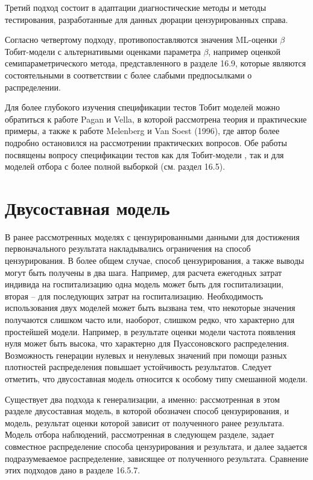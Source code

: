 Третий подход состоит в адаптации диагностические методы и методы тестирования, разработанные для данных дюрации цензурированных справа.


Согласно четвертому подходу, противопоставляются значения ML-оценки $\beta$ Тобит-модели с альтернативыми оценками параметра $\beta$, например оценкой семипараметрического метода, представленного в разделе 16.9, которые являются состоятельными в соответствии с более слабыми предпосылками о распределении.

Для более глубокого изучения спецификации тестов Тобит моделей можно обратиться к работе Pagan и Vella, в которой рассмотрена теория и практические примеры, а также к работе Melenberg и Van Soest (1996), где автор более подробно остановился на рассмотрении практических вопросов. Обе работы посвящены вопросу спецификации тестов как для Тобит-модели , так и для моделей отбора с более полной выборкой (см. раздел 16.5).


\section{Двусоставная модель}

В ранее рассмотренных моделях с цензурированными данными для достижения первоначального результата накладывались ограничения на способ цензурирования. В более общем случае, способ цензурирования, а также выводы могут быть получены в два шага. Например, для расчета ежегодных затрат индивида на госпитализацию одна модель может быть для госпитализации, вторая – для последующих затрат на госпитализацию. Необходимость использования двух моделей может быть вызвана тем, что некоторые значения получаются слишком часто или, наоборот, слишком редко, что характерно для простейшей модели. Например, в результате оценки модели частота появления нуля может быть высока, что характерно для Пуассоновского распределения. Возможность генерации нулевых и ненулевых значений при помощи разных плотностей распределения повышает устойчивость результатов. Следует отметить, что двусоставная модель относится к особому типу смешанной модели.

Существует два подхода к генерализации, а именно: рассмотренная в этом разделе двусоставная модель, в которой обозначен способ цензурирования, и модель, результат оценки которой зависит от полученного ранее результата. Модель отбора наблюдений, рассмотренная в следующем разделе, задает совместное распределение способа цензурирования и результата, и далее задается подразумеваемое распределение, зависящее от полученного результата. Сравнение этих подходов дано в разделе 16.5.7.

